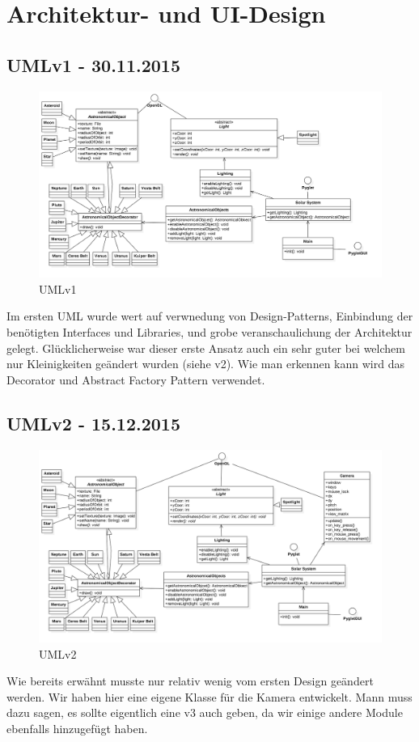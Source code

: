 \section{Architektur- und UI-Design}
\label{sec:Design}

\subsection{UMLv1 - 30.11.2015}
\begin{figure}[h]
\caption{UMLv1}
\centering
\includegraphics[scale=0.4]{images/UML-30112015_v1.png}
\end{figure}

Im ersten UML wurde wert auf verwnedung von Design-Patterns, Einbindung der benötigten Interfaces und Libraries, und grobe
veranschaulichung der Architektur gelegt. Glücklicherweise war dieser erste Ansatz auch ein sehr guter bei welchem nur 
Kleinigkeiten geändert wurden (siehe v2). Wie man erkennen kann wird das Decorator und Abstract Factory Pattern verwendet. 

\clearpage
\subsection{UMLv2 - 15.12.2015}
\begin{figure}[h]
\caption{UMLv2}
\centering
\includegraphics[scale=0.4]{images/UML-15122015_v2.png}
\end{figure}
Wie bereits erwähnt musste nur relativ wenig vom ersten Design geändert werden. Wir haben hier eine eigene Klasse für
die Kamera entwickelt. Mann muss dazu sagen, es sollte eigentlich eine v3 auch geben, da wir einige andere Module
ebenfalls hinzugefügt haben.


